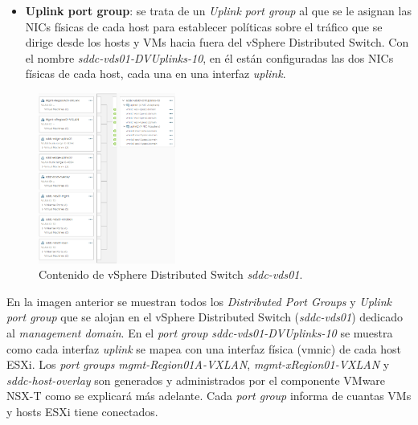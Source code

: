 \begin{itemize}
        \item \textbf{Uplink port group}: se trata de un \textit{Uplink port group} al que se le asignan las NICs físicas de cada host para establecer políticas sobre el tráfico que se dirige desde los hosts y VMs hacia fuera del vSphere Distributed Switch. Con el nombre \textit{sddc-vds01-DVUplinks-10}, en él están configuradas las dos NICs físicas de cada host, cada una en una interfaz \textit{uplink}.
        
\end{itemize}
\begin{figure}[h]
  \centering
  \includegraphics[width=0.4\textwidth]{imaxes/pruebaconcepto/distributedSwitchEntornoFinal.png}
  \caption{Contenido de vSphere Distributed Switch \textit{sddc-vds01}.}
  \label{fig:port-groups-vSwitch-vSphere}
\end{figure}
\FloatBarrier
En la imagen anterior se muestran todos los \textit{Distributed Port Groups} y \textit{Uplink port group} que se alojan en el vSphere Distributed Switch (\textit{sddc-vds01}) dedicado al \textit{management domain}. En el \textit{port group} \textit{sddc-vds01-DVUplinks-10} se muestra como cada interfaz \textit{uplink} se mapea con una interfaz física (vmnic) de cada host ESXi. Los \textit{port groups} \textit{mgmt-Region01A-VXLAN}, \textit{mgmt-xRegion01-VXLAN} y \textit{sddc-host-overlay} son generados y administrados por el componente VMware NSX-T como se explicará más adelante. Cada \textit{port group} informa de cuantas VMs y hosts ESXi tiene conectados.


